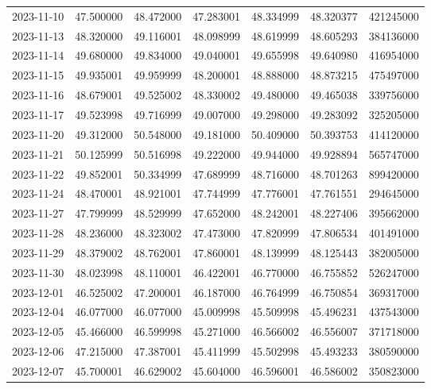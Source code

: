 \begin{tabular}{lrrrrrr}
2023-11-10 &   47.500000 &   48.472000 &   47.283001 &   48.334999 &   48.320377 &   421245000 \\
2023-11-13 &   48.320000 &   49.116001 &   48.098999 &   48.619999 &   48.605293 &   384136000 \\
2023-11-14 &   49.680000 &   49.834000 &   49.040001 &   49.655998 &   49.640980 &   416954000 \\
2023-11-15 &   49.935001 &   49.959999 &   48.200001 &   48.888000 &   48.873215 &   475497000 \\
2023-11-16 &   48.679001 &   49.525002 &   48.330002 &   49.480000 &   49.465038 &   339756000 \\
2023-11-17 &   49.523998 &   49.716999 &   49.007000 &   49.298000 &   49.283092 &   325205000 \\
2023-11-20 &   49.312000 &   50.548000 &   49.181000 &   50.409000 &   50.393753 &   414120000 \\
2023-11-21 &   50.125999 &   50.516998 &   49.222000 &   49.944000 &   49.928894 &   565747000 \\
2023-11-22 &   49.852001 &   50.334999 &   47.689999 &   48.716000 &   48.701263 &   899420000 \\
2023-11-24 &   48.470001 &   48.921001 &   47.744999 &   47.776001 &   47.761551 &   294645000 \\
2023-11-27 &   47.799999 &   48.529999 &   47.652000 &   48.242001 &   48.227406 &   395662000 \\
2023-11-28 &   48.236000 &   48.323002 &   47.473000 &   47.820999 &   47.806534 &   401491000 \\
2023-11-29 &   48.379002 &   48.762001 &   47.860001 &   48.139999 &   48.125443 &   382005000 \\
2023-11-30 &   48.023998 &   48.110001 &   46.422001 &   46.770000 &   46.755852 &   526247000 \\
2023-12-01 &   46.525002 &   47.200001 &   46.187000 &   46.764999 &   46.750854 &   369317000 \\
2023-12-04 &   46.077000 &   46.077000 &   45.009998 &   45.509998 &   45.496231 &   437543000 \\
2023-12-05 &   45.466000 &   46.599998 &   45.271000 &   46.566002 &   46.556007 &   371718000 \\
2023-12-06 &   47.215000 &   47.387001 &   45.411999 &   45.502998 &   45.493233 &   380590000 \\
2023-12-07 &   45.700001 &   46.629002 &   45.604000 &   46.596001 &   46.586002 &   350823000 \\

\end{tabular}
